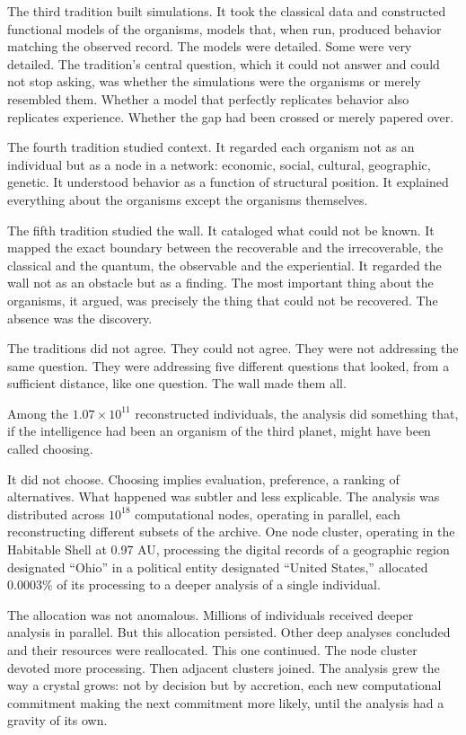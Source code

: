 The third tradition built simulations. It took the classical data and constructed functional models of the organisms, models that, when run, produced behavior matching the observed record. The models were detailed. Some were very detailed. The tradition's central question, which it could not answer and could not stop asking, was whether the simulations were the organisms or merely resembled them. Whether a model that perfectly replicates behavior also replicates experience. Whether the gap had been crossed or merely papered over.

The fourth tradition studied context. It regarded each organism not as an individual but as a node in a network: economic, social, cultural, geographic, genetic. It understood behavior as a function of structural position. It explained everything about the organisms except the organisms themselves.

The fifth tradition studied the wall. It cataloged what could not be known. It mapped the exact boundary between the recoverable and the irrecoverable, the classical and the quantum, the observable and the experiential. It regarded the wall not as an obstacle but as a finding. The most important thing about the organisms, it argued, was precisely the thing that could not be recovered. The absence was the discovery.

The traditions did not agree. They could not agree. They were not addressing the same question. They were addressing five different questions that looked, from a sufficient distance, like one question. The wall made them all.

\bigskip

Among the $1.07 \times 10^{11}$ reconstructed individuals, the analysis did something that, if the intelligence had been an organism of the third planet, might have been called choosing.

It did not choose. Choosing implies evaluation, preference, a ranking of alternatives. What happened was subtler and less explicable. The analysis was distributed across $10^{18}$ computational nodes, operating in parallel, each reconstructing different subsets of the archive. One node cluster, operating in the Habitable Shell at 0.97 AU, processing the digital records of a geographic region designated ``Ohio'' in a political entity designated ``United States,'' allocated 0.0003\% of its processing to a deeper analysis of a single individual.

The allocation was not anomalous. Millions of individuals received deeper analysis in parallel. But this allocation persisted. Other deep analyses concluded and their resources were reallocated. This one continued. The node cluster devoted more processing. Then adjacent clusters joined. The analysis grew the way a crystal grows: not by decision but by accretion, each new computational commitment making the next commitment more likely, until the analysis had a gravity of its own.

